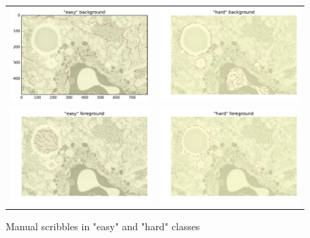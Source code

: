 \begin{figure}[h!] \label{fig:scribbles}
\begin{tabular}{cc}
 \includegraphics[width=0.5\linewidth]{figures/easy_bg.pdf} & \includegraphics[width=0.5\linewidth]{figures/hard_bg.pdf} \\
 \includegraphics[width=0.5\linewidth]{figures/easy_fg.pdf} & \includegraphics[width=0.5\linewidth]{figures/hard_fg.pdf} \\ 
\end{tabular}
\caption{Manual scribbles in "easy" and "hard" classes}
\end{figure}


